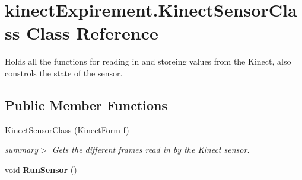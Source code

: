 \hypertarget{classkinect_expirement_1_1_kinect_sensor_class}{}\section{kinect\+Expirement.\+Kinect\+Sensor\+Class Class Reference}
\label{classkinect_expirement_1_1_kinect_sensor_class}


Holds all the functions for reading in and storeing values from the Kinect, also constrols the state of the sensor.  


\subsection*{Public Member Functions}
\begin{DoxyCompactItemize}
\item 
\hyperlink{classkinect_expirement_1_1_kinect_sensor_class_afff859ca767af86cfde5b1b8ab1275f1}{Kinect\+Sensor\+Class} (\hyperlink{classkinect_expirement_1_1_kinect_form}{Kinect\+Form} f)
\begin{DoxyCompactList}\small\item\em summary$>$ Gets the different frames read in by the Kinect sensor. \end{DoxyCompactList}\item 
void {\bfseries Run\+Sensor} ()\hypertarget{classkinect_expirement_1_1_kinect_sensor_class_a2f22d9db1e17341d96282c3331826573}{}\label{classkinect_expirement_1_1_kinect_sensor_class_a2f22d9db1e17341d96282c3331826573}

\end{DoxyCompactItemize}
